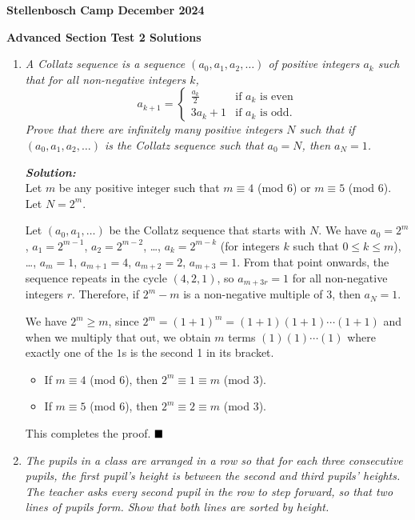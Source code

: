 \documentclass[12pt]{article}
\newcommand{\sol}[0]{\textbf{\textit{Solution:\\}}}
\begin{document}
\begin{center}
    \textbf{Stellenbosch Camp December 2024}
    
    \textbf{Advanced Section Test 2 Solutions}
\end{center}

\begin{enumerate}
\item \textit{A \emph{Collatz sequence} is a sequence \((a_{0}, a_{1}, a_{2}, \ldots)\) of positive integers \(a_{k}\) such that for all non-negative integers \(k\),
\[a_{k + 1} = \begin{cases}
\frac{a_{k}}{2} & \textrm{if \(a_{k}\) is even}\\
3a_{k} + 1 & \textrm{if \(a_{k}\) is odd.}
\end{cases}\]
Prove that there are infinitely many positive integers \(N\) such that if \((a_{0}, a_{1}, a_{2}, \ldots)\) is the Collatz sequence such that \(a_{0} = N\), then \(a_{N} = 1\).}

\sol
Let \(m\) be any positive integer such that \(m \equiv 4\) (mod 6) or \(m \equiv 5\) (mod 6). Let \(N = 2^{m}\).

Let \((a_{0}, a_{1}, \ldots)\) be the Collatz sequence that starts with \(N\). We have \(a_{0} = 2^{m}\), \(a_{1} = 2^{m - 1}\), \(a_{2} = 2^{m - 2}\), \ldots, \(a_{k} = 2^{m - k}\) (for integers \(k\) such that \(0 \leqslant k \leqslant m\)), \ldots, \(a_{m} = 1\), \(a_{m + 1} = 4\), \(a_{m + 2} = 2\), \(a_{m + 3} = 1\). From that point onwards, the sequence repeats in the cycle \((4, 2, 1)\), so \(a_{m + 3r} = 1\) for all non-negative integers \(r\). Therefore, if \(2^{m} - m\) is a non-negative multiple of 3, then \(a_{N} = 1\).

We have \(2^{m} \geqslant m\), since \(2^{m} = (1 + 1)^{m} = (1 + 1)(1 + 1)\cdots{}(1 + 1)\) and when we multiply that out, we obtain \(m\) terms \((1)(1)\cdots(1)\) where exactly one of the $1$s is the second 1 in its bracket.
\begin{itemize}
\item If \(m \equiv 4\) (mod 6), then \(2^{m} \equiv 1 \equiv m\) (mod 3).
\item If \(m \equiv 5\) (mod 6), then \(2^{m} \equiv 2 \equiv m\) (mod 3).
\end{itemize}
This completes the proof. $\hfill\blacksquare$

\item \textit{The pupils in a class are arranged in a row so that for each three consecutive pupils, the first pupil's height is between the second and third pupils' heights. The teacher asks every second pupil in the row to step forward, so that two lines of pupils form. Show that both lines are sorted by height.}


\end{enumerate}
\end{document}
